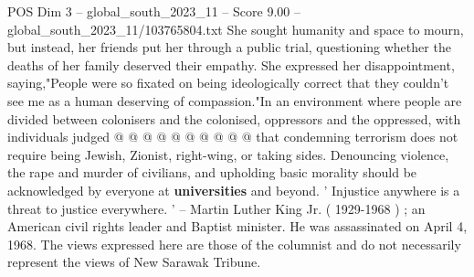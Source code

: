 \begin{textsample}{POS Dim 3 – global\_south\_2023\_11 – Score 9.00 – global\_south\_2023\_11/103765804.txt}
She sought humanity and space to mourn, but instead, her friends put her through a public trial, questioning whether the deaths of her family deserved their empathy.
She expressed her disappointment, saying,"People were so fixated on being ideologically correct that they couldn't see me as a human deserving of compassion."In an environment where people are divided between colonisers and the colonised, oppressors and the oppressed, with individuals judged @ @ @ @ @ @ @ @ @ @ that condemning terrorism does not require being Jewish, Zionist, right-wing, or taking sides.
Denouncing violence, the rape and murder of civilians, and upholding basic morality should be acknowledged by everyone at \textbf{universities} and beyond. ' Injustice anywhere is a threat to justice everywhere. ' -- Martin Luther King Jr. ( 1929-1968 ) ; an American civil rights leader and Baptist minister.
He was assassinated on April 4, 1968.
The views expressed here are those of the columnist and do not necessarily represent the views of New Sarawak Tribune.

\end{textsample}
